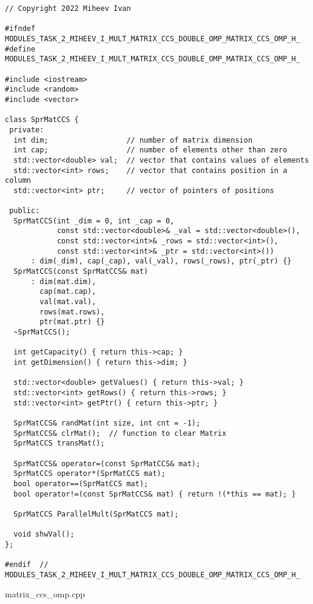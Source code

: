 \documentclass{report}
\begin{document}
\begin{lstlisting}
// Copyright 2022 Miheev Ivan

#ifndef MODULES_TASK_2_MIHEEV_I_MULT_MATRIX_CCS_DOUBLE_OMP_MATRIX_CCS_OMP_H_
#define MODULES_TASK_2_MIHEEV_I_MULT_MATRIX_CCS_DOUBLE_OMP_MATRIX_CCS_OMP_H_

#include <iostream>
#include <random>
#include <vector>

class SprMatCCS {
 private:
  int dim;                  // number of matrix dimension
  int cap;                  // number of elements other than zero
  std::vector<double> val;  // vector that contains values of elements
  std::vector<int> rows;    // vector that contains position in a column
  std::vector<int> ptr;     // vector of pointers of positions

 public:
  SprMatCCS(int _dim = 0, int _cap = 0,
            const std::vector<double>& _val = std::vector<double>(),
            const std::vector<int>& _rows = std::vector<int>(),
            const std::vector<int>& _ptr = std::vector<int>())
      : dim(_dim), cap(_cap), val(_val), rows(_rows), ptr(_ptr) {}
  SprMatCCS(const SprMatCCS& mat)
      : dim(mat.dim),
        cap(mat.cap),
        val(mat.val),
        rows(mat.rows),
        ptr(mat.ptr) {}
  ~SprMatCCS();

  int getCapacity() { return this->cap; }
  int getDimension() { return this->dim; }

  std::vector<double> getValues() { return this->val; }
  std::vector<int> getRows() { return this->rows; }
  std::vector<int> getPtr() { return this->ptr; }

  SprMatCCS& randMat(int size, int cnt = -1);
  SprMatCCS& clrMat();  // function to clear Matrix
  SprMatCCS transMat();

  SprMatCCS& operator=(const SprMatCCS& mat);
  SprMatCCS operator*(SprMatCCS mat);
  bool operator==(SprMatCCS mat);
  bool operator!=(const SprMatCCS& mat) { return !(*this == mat); }

  SprMatCCS ParallelMult(SprMatCCS mat);

  void shwVal();
};

#endif  // MODULES_TASK_2_MIHEEV_I_MULT_MATRIX_CCS_DOUBLE_OMP_MATRIX_CCS_OMP_H_
\end{lstlisting}

\newline matrix\_ccs\_omp.cpp
\end{document}
